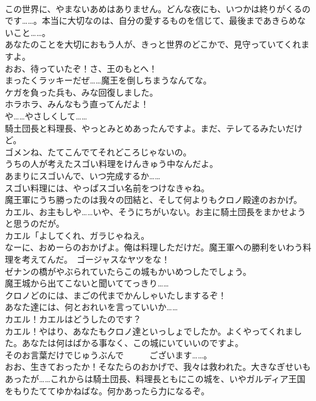 \documentclass[8pt]{extreport}
\begin{document}
\begin{CJK}{UTF8}{min}
\\	この世界に、やまないあめはありません。どんな夜にも、いつかは終りがくるのです……。本当に大切なのは、自分の愛するものを信じて、最後まであきらめないこと……。	
\\	あなたのことを大切におもう人が、きっと世界のどこかで、見守っていてくれますよ。	
\\	おお、待っていたぞ！さ、王のもとへ！	
\\	まったくラッキーだぜ……魔王を倒しちまうなんてな。	
\\	ケガを負った兵も、みな回復しました。	
\\	ホラホラ、みんなもう直ってんだよ！	
\\	や……やさしくして……	
\\	騎土団長と料理長、やっとみとめあったんですよ。まだ、テレてるみたいだけど。	
\\	ゴメンね、たてこんでてそれどころじゃないの。	
\\	うちの人が考えたスゴい料理をけんきゅう中なんだよ。	
\\	あまりにスゴいんで、いつ完成するか……	
\\	スゴい料理には、やっぱスゴい名前をつけなきゃね。	
\\	魔王軍にうち勝ったのは我々の団結と、そして何よりもクロノ殿達のおかげ。	
\\	カエル、お主もしや……いや、そうにちがいない。お主に騎土団長をまかせようと思うのだが。	
\\	カエル「よしてくれ、ガラじゃねえ。	
\\	なーに、おめーらのおかげよ。俺は料理しただけだ。魔王軍への勝利をいわう料理を考えてんだ。　ゴージャスなヤツをな！	
\\	ゼナンの橋がやぶられていたらこの城もかいめつしたでしょう。	
\\	魔王城から出てこないと聞いててっきり……	
\\	クロノどのには、まごの代までかんしゃいたしまするぞ！	
\\	あなた達には、何とおれいを言っていいか……	
\\	カエル！カエルはどうしたのです？	
\\	カエル！やはり、あなたもクロノ達といっしょでしたか。よくやってくれました。あなたは何はばかる事なく、この城にいていいのですよ。	
\\	そのお言葉だけでじゅうぶんで　　　ございます……。 
\\	おお、生きておったか！そなたらのおかげで、我々は救われた。大きなぎせいもあったが……これからは騎土団長、料理長ともにこの城を、いやガルディア王国をもりたててゆかねばな。何かあったら力になるぞ。	

\end{CJK}
\end{document}
